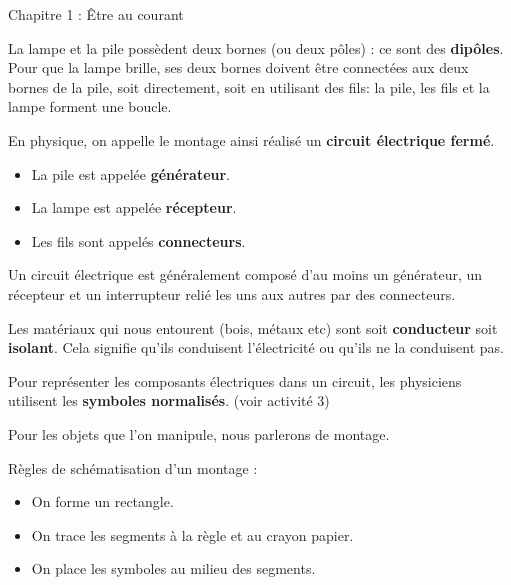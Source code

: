 \documentclass[24pt]{article}
\newcommand{\titre}{Chapitre 1 : Être au courant} %
\begin{document}
\thispagestyle{fancy}
\cfoot{}

\begin{titlebox}{\titre}
    \setlength\parindent{4pt} %
    \setlength\parskip{5pt} 

    La lampe et la pile possèdent deux bornes (ou deux pôles) : ce sont des \textbf{\color{DarkRed} {dipôles}}. Pour que la lampe brille, ses deux
    bornes doivent être connectées aux deux bornes de la pile, soit directement, soit en utilisant des fils: la pile, les fils et
    la lampe forment une boucle. 
    
    En physique, on appelle le montage ainsi réalisé un \textbf{\color{DarkRed} {circuit électrique fermé}}.

    \begin{itemize}
        \item La pile est appelée \textbf{\color{DarkRed} {générateur}}.
        \item La lampe est appelée \textbf{\color{DarkRed} {récepteur}}.
        \item Les fils sont appelés \textbf{\color{DarkRed} {connecteurs}}.
    \end{itemize}

    Un circuit électrique est généralement composé d’au moins un
    générateur, un récepteur et un interrupteur relié les uns
    aux autres par des connecteurs.
    
    \vspace{50pt}

    Les matériaux qui nous entourent (bois, métaux etc) sont soit \textbf{\color{DarkRed} {conducteur}} soit \textbf{\color{DarkRed} {isolant}}.
    Cela signifie qu'ils conduisent l'électricité ou qu'ils ne la conduisent pas.

    \vspace{50pt}

    Pour représenter les composants électriques dans un circuit, 
    les physiciens utilisent les \textbf{\color{DarkRed} {symboles normalisés}}. (voir activité 3)
    
    Pour les objets que l’on manipule, nous parlerons de montage.
    
    \begin{mybox}
        Règles de schématisation d'un montage :
        \begin{itemize}
            \item On forme un rectangle.
            \item On trace les segments à la règle et au crayon papier.
            \item On place les symboles au milieu des segments.    

        \end{itemize}    
    \end{mybox}

\end{titlebox}
\end{document}
